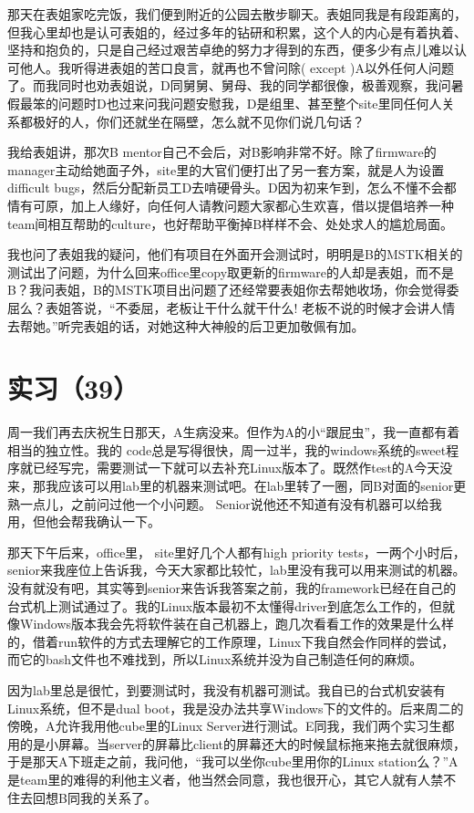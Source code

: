 \documentclass[12pt]{book}
\begin{document}
那天在表姐家吃完饭，我们便到附近的公园去散步聊天。表姐同我是有段距离的，但我心里却也是认可表姐的，经过多年的钻研和积累，这个人的内心是有着执着、坚持和抱负的，只是自己经过艰苦卓绝的努力才得到的东西，便多少有点儿难以认可他人。我听得进表姐的苦口良言，就再也不曾问除( except )A以外任何人问题了。而我同时也劝表姐说，D同舅舅、舅母、我的同学都很像，极善观察，我问暑假最笨的问题时D也过来问我问题安慰我，D是组里、甚至整个site里同任何人关系都极好的人，你们还就坐在隔壁，怎么就不见你们说几句话？

我给表姐讲，那次B mentor自己不会后，对B影响非常不好。除了firmware的manager主动给她面子外，site里的大官们便打出了另一套方案，就是人为设置difficult bugs，然后分配新员工D去啃硬骨头。D因为初来乍到，怎么不懂不会都情有可原，加上人缘好，向任何人请教问题大家都心生欢喜，借以提倡培养一种team间相互帮助的culture，也好帮助平衡掉B样样不会、处处求人的尴尬局面。

我也问了表姐我的疑问，他们有项目在外面开会测试时，明明是B的MSTK相关的测试出了问题，为什么回来office里copy取更新的firmware的人却是表姐，而不是B？我问表姐，B的MSTK项目出问题了还经常要表姐你去帮她收场，你会觉得委屈么？表姐答说，“不委屈，老板让干什么就干什么! 老板不说的时候才会讲人情去帮她。”听完表姐的话，对她这种大神般的后卫更加敬佩有加。


\section{实习（39）}
\label{sec-5-42}

周一我们再去庆祝生日那天，A生病没来。但作为A的小“跟屁虫”，我一直都有着相当的独立性。我的  code总是写得很快，周一过半，我的windows系统的sweet程序就已经写完，需要测试一下就可以去补充Linux版本了。既然作test的A今天没来，那我应该可以用lab里的机器来测试吧。在lab里转了一圈，同B对面的senior更熟一点儿，之前问过他一个小问题。 Senior说他还不知道有没有机器可以给我用，但他会帮我确认一下。

那天下午后来，office里， site里好几个人都有high priority tests，一两个小时后，senior来我座位上告诉我，今天大家都比较忙，lab里没有我可以用来测试的机器。没有就没有吧，其实等到senior来告诉我答案之前，我的framework已经在自己的台式机上测试通过了。我的Linux版本最初不太懂得driver到底怎么工作的，但就像Windows版本我会先将软件装在自己机器上，跑几次看看工作的效果是什么样的，借着run软件的方式去理解它的工作原理，Linux下我自然会作同样的尝试，而它的bash文件也不难找到，所以Linux系统并没为自己制造任何的麻烦。

因为lab里总是很忙，到要测试时，我没有机器可测试。我自已的台式机安装有Linux系统，但不是dual boot，我是没办法共享Windows下的文件的。后来周二的傍晚，A允许我用他cube里的Linux Server进行测试。E同我，我们两个实习生都用的是小屏幕。当server的屏幕比client的屏幕还大的时候鼠标拖来拖去就很麻烦，于是那天A下班走之前，我问他，“我可以坐你cube里用你的Linux station么？”A是team里的难得的利他主义者，他当然会同意，我也很开心，其它人就有人禁不住去回想B同我的关系了。
\end{document}
